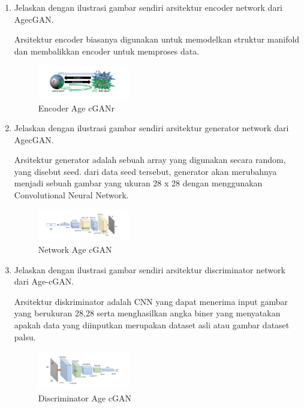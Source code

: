 \begin{enumerate}
        \item Jelaskan dengan ilustrasi gambar sendiri arsitektur encoder network dari AgecGAN.

Arsitektur encoder biasanya digunakan untuk memodelkan struktur manifold dan membalikkan encoder untuk memproses data.

	\begin{figure}[H]
		\includegraphics[width=4cm]{figures/1174069/9/teori3.PNG}
            	\centering
           	\caption{Encoder Age cGANr}
       	 \end{figure}

        \item Jelaskan dengan ilustrasi gambar sendiri arsitektur generator network dari AgecGAN.

Arsitektur generator adalah sebuah array yang digunakan secara random, yang disebut seed. dari data seed tersebut, generator akan merubahnya menjadi sebuah gambar yang ukuran 28 x 28 dengan menggunakan Convolutional Neural Network.

	\begin{figure}[H]
		\includegraphics[width=4cm]{figures/1174069/9/teori4.PNG}
            	\centering
           	\caption{Network Age cGAN}
       	 \end{figure}


        \item Jelaskan dengan ilustrasi gambar sendiri arsitektur discriminator network dari Age-cGAN.

Arsitektur diskriminator adalah CNN yang dapat menerima input gambar yang berukuran 28,28 serta menghasilkan angka biner yang menyatakan apakah data yang diinputkan merupakan dataset asli atau gambar dataset palsu.

	\begin{figure}[H]
		\includegraphics[width=4cm]{figures/1174069/9/teori5.PNG}
            	\centering
           	\caption{Discriminator Age cGAN}
       	 \end{figure}



\end{enumerate}

